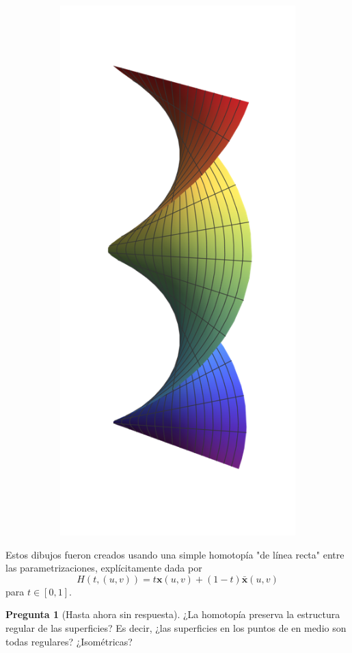 \documentclass[spanish]{book}
\theoremstyle{definition}
\newtheorem*{pregunta}{Pregunta}
\begin{document}
\begin{figure}[H]
\begin{subfigure}{0.125\textwidth}
			\includegraphics[width=\linewidth]{sup14}
		\end{subfigure}
	\end{figure}
	\vspace{-.6cm}
	Estos dibujos fueron creados usando una simple homotopía "de línea recta" entre las parametrizaciones, explícitamente dada por
	\[H(t,(u,v))=t\mathbf{x}(u,v)+(1-t)\bar{\mathbf{x}}(u,v)\]
	para $t\in[0,1]$.
	\begin{pregunta}[Hasta ahora sin respuesta]
		¿La homotopía preserva la estructura regular de las superficies? Es decir, ¿las superficies en los puntos de en medio son todas regulares? ¿Isométricas?
	\end{pregunta}
	
\end{document}
